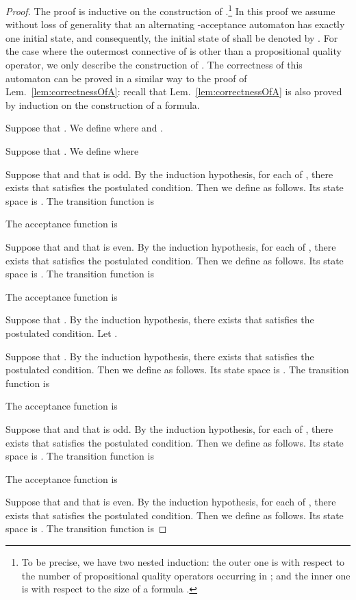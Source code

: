 \documentclass[a4paper,USenglish,numberwithinsect]{lipics}
\theoremstyle{definition}
\theoremstyle{remark}
\theoremstyle{plain}
\begin{document}
\begin{proof}
  The proof is inductive on the construction of .\footnote{To
 be precise, we have two nested induction: the outer one is with respect
 to the number of propositional quality operators occurring in
 ; and the inner one is with respect to the size of a formula .} In this proof
 we assume without loss of generality that an alternating
 -acceptance automaton has exactly one initial state, and
 consequently, the initial state of 
 shall be denoted by . For the case
 where the outermost connective of  is other than a
 propositional quality operator, we only describe the construction of
 . The correctness of this automaton
 can be proved in a similar way to the proof of
 Lem.~\ref{lem:correctnessOfA}:
recall that Lem.~\ref{lem:correctnessOfA} is also proved by induction on the construction of a formula. 
  
  Suppose that . We define  
  where  and 
  . 
  
  Suppose that . We define  where 

 
 Suppose that  and that
  is odd. By the induction hypothesis, for each of , there exists  that satisfies the postulated condition. Then we define  as follows. Its state space  is . The transition function  is

  The acceptance function  is


 Suppose that  and that
  is even. By the induction hypothesis, for each of , there exists  that satisfies the postulated condition. Then we define  as follows. Its state space  is . The transition function  is

  The acceptance function  is


Suppose that . By the induction hypothesis, there exists  that satisfies the postulated condition. Let .

 Suppose that . By the induction hypothesis, there exists  that satisfies the postulated condition. Then we define  as follows. Its state space  is . The transition function  is

  The acceptance function  is


 Suppose that  and that
  is odd. By the induction hypothesis, for each of , there exists  that satisfies the postulated condition. Then we define  as follows. Its state space  is . The transition function  is

  The acceptance function  is


 Suppose that  and that
  is even. By the induction hypothesis, for each of , there exists  that satisfies the postulated condition. Then we define  as follows. Its state space  is . The transition function  is


\end{proof}
\end{document}
